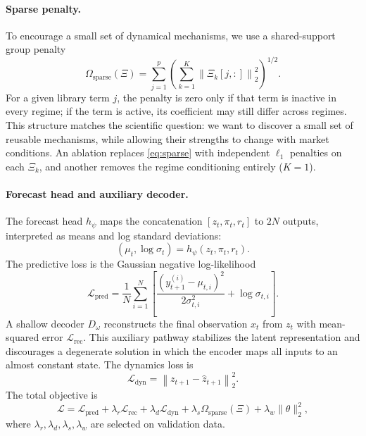\documentclass{article}
\begin{document}
\paragraph{Sparse penalty.}
To encourage a small set of dynamical mechanisms, we use a shared-support group penalty
\begin{equation}
  \Omega_{\mathrm{sparse}}(\Xi)
  = \sum_{j=1}^{p}
    \left(
      \sum_{k=1}^{K} \left\| \Xi_k[j,:] \right\|_2^2
    \right)^{1/2}.
  \label{eq:sparse}
\end{equation}
For a given library term $j$, the penalty is zero only if that term is inactive in every regime; if the term is active, its coefficient may still differ across regimes. This structure matches the scientific question: we want to discover a small set of reusable mechanisms, while allowing their strengths to change with market conditions. An ablation replaces \eqref{eq:sparse} with independent $\ell_1$ penalties on each $\Xi_k$, and another removes the regime conditioning entirely ($K=1$).

\paragraph{Forecast head and auxiliary decoder.}
The forecast head $h_\psi$ maps the concatenation $[z_t, \pi_t, r_t]$ to $2N$ outputs, interpreted as means and log standard deviations:
\begin{equation}
  (\mu_t, \log \sigma_t) = h_\psi(z_t, \pi_t, r_t).
\end{equation}
The predictive loss is the Gaussian negative log-likelihood
\begin{equation}
  \mathcal{L}_{\mathrm{pred}}
  = \frac{1}{N}\sum_{i=1}^{N}
    \left[
      \frac{(y_{t+1}^{(i)}-\mu_{t,i})^2}{2\sigma_{t,i}^2}
      + \log \sigma_{t,i}
    \right].
\end{equation}
A shallow decoder $D_\omega$ reconstructs the final observation $x_t$ from $z_t$ with mean-squared error $\mathcal{L}_{\mathrm{rec}}$. This auxiliary pathway stabilizes the latent representation and discourages a degenerate solution in which the encoder maps all inputs to an almost constant state. The dynamics loss is
\begin{equation}
  \mathcal{L}_{\mathrm{dyn}}
  = \left\| z_{t+1} - \hat{z}_{t+1} \right\|_2^2.
\end{equation}
The total objective is
\begin{equation}
  \mathcal{L}
  = \mathcal{L}_{\mathrm{pred}}
  + \lambda_r \mathcal{L}_{\mathrm{rec}}
  + \lambda_d \mathcal{L}_{\mathrm{dyn}}
  + \lambda_s \Omega_{\mathrm{sparse}}(\Xi)
  + \lambda_w \|\theta\|_2^2,
  \label{eq:total-loss}
\end{equation}
where $\lambda_r,\lambda_d,\lambda_s,\lambda_w$ are selected on validation data.
\end{document}
